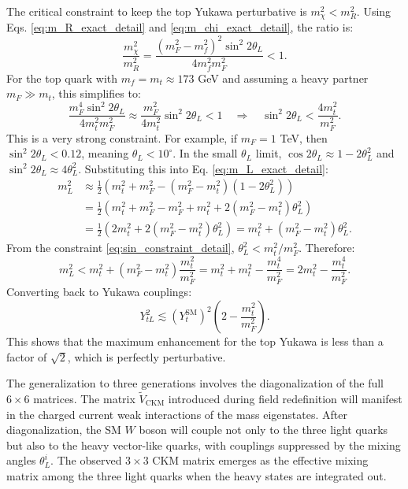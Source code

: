 The critical constraint to keep the top Yukawa perturbative is $m_{\chi}^2 < m_R^2$. Using Eqs. \eqref{eq:m_R_exact_detail} and \eqref{eq:m_chi_exact_detail}, the ratio is:
\begin{equation}
\frac{m_{\chi}^2}{m_R^2} = \frac{(m_F^2 - m_f^2)^2 \sin^2 2\theta_L}{4 m_f^2 m_F^2} < 1. \label{eq:constraint_detail}
\end{equation}
For the top quark with $m_f = m_t \approx 173$ GeV and assuming a heavy partner $m_F \gg m_t$, this simplifies to:
\begin{equation}
\frac{m_F^4 \sin^2 2\theta_L}{4 m_t^2 m_F^2} \approx \frac{m_F^2}{4 m_t^2} \sin^2 2\theta_L < 1 \quad \Rightarrow \quad \sin^2 2\theta_L < \frac{4 m_t^2}{m_F^2}. \label{eq:sin_constraint_detail}
\end{equation}
This is a very strong constraint. For example, if $m_F = 1$ TeV, then $\sin^2 2\theta_L < 0.12$, meaning $\theta_L < 10^\circ$. In the small $\theta_L$ limit, $\cos 2\theta_L \approx 1 - 2\theta_L^2$ and $\sin^2 2\theta_L \approx 4\theta_L^2$. Substituting this into Eq. \eqref{eq:m_L_exact_detail}:
\begin{align*}
m_L^2 &\approx \frac{1}{2} \left( m_t^2 + m_F^2 - (m_F^2 - m_t^2)(1 - 2\theta_L^2) \right) \\
&= \frac{1}{2} \left( m_t^2 + m_F^2 - m_F^2 + m_t^2 + 2(m_F^2 - m_t^2)\theta_L^2 \right) \\
&= \frac{1}{2} \left( 2m_t^2 + 2(m_F^2 - m_t^2)\theta_L^2 \right) = m_t^2 + (m_F^2 - m_t^2)\theta_L^2.
\end{align*}
From the constraint \eqref{eq:sin_constraint_detail}, $\theta_L^2 < m_t^2 / m_F^2$. Therefore:
\begin{equation}
m_L^2 < m_t^2 + (m_F^2 - m_t^2) \frac{m_t^2}{m_F^2} = m_t^2 + m_t^2 - \frac{m_t^4}{m_F^2} = 2m_t^2 - \frac{m_t^4}{m_F^2}.
\end{equation}
Converting back to Yukawa couplings:
\begin{equation}
Y_{tL}^2 \lesssim (Y_t^{\text{SM}})^2 \left( 2 - \frac{m_t^2}{m_F^2} \right). \label{eq:Y_final_detail}
\end{equation}
This shows that the maximum enhancement for the top Yukawa is less than a factor of $\sqrt{2}$, which is perfectly perturbative.

The generalization to three generations involves the diagonalization of the full $6 \times 6$ matrices. The matrix $\tilde{V}_{\text{CKM}}$ introduced during field redefinition will manifest in the charged current weak interactions of the mass eigenstates. After diagonalization, the SM $W$ boson will couple not only to the three light quarks but also to the heavy vector-like quarks, with couplings suppressed by the mixing angles $\theta_L^i$. The observed $3 \times 3$ CKM matrix emerges as the effective mixing matrix among the three light quarks when the heavy states are integrated out.


